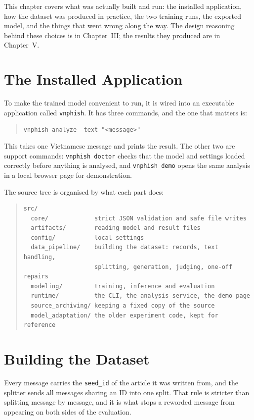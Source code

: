 This chapter covers what was actually built and run: the installed application, how the dataset was produced in practice, the two training runs, the exported model, and the things that went wrong along the way. The design reasoning behind these choices is in Chapter~III; the results they produced are in Chapter~V.

\section{The Installed Application}

To make the trained model convenient to run, it is wired into an executable application called \texttt{vnphish}. It has three commands, and the one that matters is:

\begin{quote}
\texttt{vnphish analyze --text "<message>"}
\end{quote}

\noindent This takes one Vietnamese message and prints the result. The other two are support commands: \texttt{vnphish doctor} checks that the model and settings loaded correctly before anything is analysed, and \texttt{vnphish demo} opens the same analysis in a local browser page for demonstration.

The source tree is organised by what each part does:

\begin{quote}
\begin{verbatim}
src/
  core/             strict JSON validation and safe file writes
  artifacts/        reading model and result files
  config/           local settings
  data_pipeline/    building the dataset: records, text handling,
                    splitting, generation, judging, one-off repairs
  modeling/         training, inference and evaluation
  runtime/          the CLI, the analysis service, the demo page
  source_archiving/ keeping a fixed copy of the source
  model_adaptation/ the older experiment code, kept for reference
\end{verbatim}
\end{quote}

\section{Building the Dataset}
\label{sec:building-dataset}

Every message carries the \texttt{seed\_id} of the article it was written from, and the splitter sends all messages sharing an ID into one split. That rule is stricter than splitting message by message, and it is what stops a reworded message from appearing on both sides of the evaluation.

